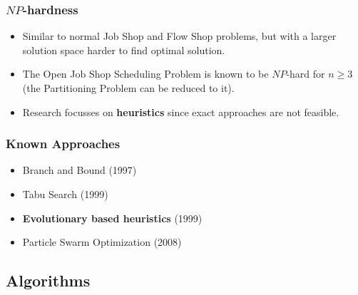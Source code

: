 \begin{frame}
	\frametitle{$NP$-hardness}
	
	\begin{itemize}
	
		\item Similar to normal Job Shop and Flow Shop problems, but with a larger solution space \textrightarrow \hspace{.5em} harder to find optimal solution.

		\item 	The Open Job Shop Scheduling Problem is known to be $NP$-hard for $n \geq 3$ (the Partitioning Problem can be reduced to it).

		\item 	\textrightarrow \hspace{.5em} Research focusses on \textbf{heuristics} since exact approaches are not feasible.
	\end{itemize}
	
	
\end{frame}


\begin{frame}
	\frametitle{Known Approaches}
	\begin{itemize}
	
		\item Branch and Bound (1997)

		\item 	Tabu Search (1999)

		\item 	\textbf{Evolutionary based heuristics} (1999)

		\item 	Particle Swarm Optimization (2008)
	\end{itemize}
	
	
\end{frame}


\subsection{Algorithms}


